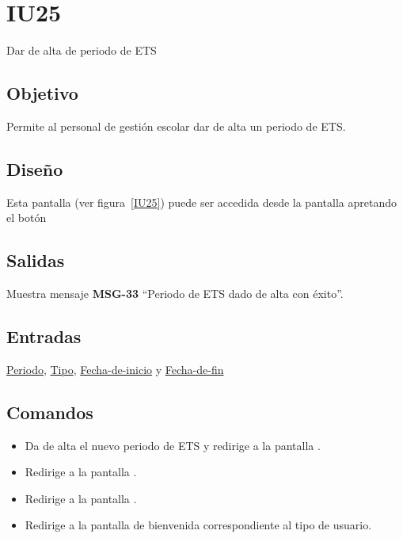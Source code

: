
\section{IU25} {Dar de alta de periodo de ETS}
\subsection{Objetivo}
    Permite al personal de gestión escolar dar de alta un periodo de ETS.
\subsection{Diseño}
    Esta pantalla  (ver figura~\ref{IU25}) puede ser accedida desde la pantalla  apretando el botón 

\subsection{Salidas}
Muestra mensaje {\bf MSG-33} ``Periodo de ETS  dado de alta con éxito''.
\subsection{Entradas}
\hyperlink{Periodo de ETS.Periodo}{Periodo}, \hyperlink{Periodo-de-ETS.Tipo}{Tipo}, \hyperlink{Periodo-de-ETS.Fecha-de-inicio}{Fecha-de-inicio} y \hyperlink{Periodo-de-ETS.Fecha-de-fin}{Fecha-de-fin}
\subsection{Comandos}
\begin{itemize}
    \item {} Da de alta el nuevo periodo de ETS y redirige a la pantalla .
    \item {} Redirige a la pantalla .
    \item {} Redirige a la pantalla .
    \item {} Redirige a la pantalla de bienvenida correspondiente al tipo de usuario.
    
\end{itemize}

